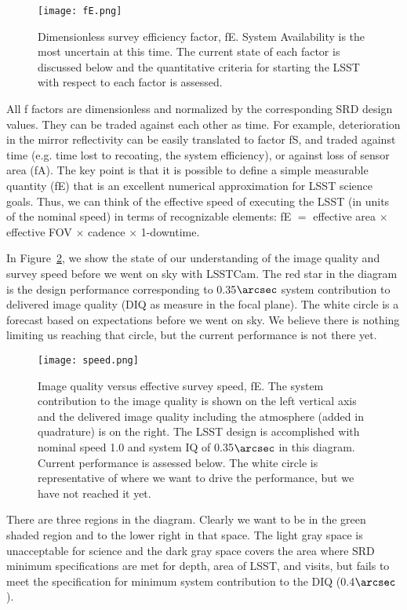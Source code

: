 \begin{figure}%
  \centering
\texttt{[image: fE.png]}
\caption{Dimensionless survey efficiency factor, fE. System Availability is the most uncertain at this time. The current state of each factor is discussed below and the quantitative criteria for starting the LSST with respect to each factor is assessed.}
\label{fE}
\end{figure}

All f factors are dimensionless and normalized by the corresponding SRD design values. They can be traded against each other as time.
For example, deterioration in the mirror reflectivity can be easily translated to factor fS, and traded against time (e.g. time lost to recoating, the system efficiency), or against loss of sensor area (fA).
The key point is that it is possible to define a simple measurable quantity (fE) that is an excellent numerical approximation for LSST science goals. Thus, we can think of the effective speed of executing the LSST (in units of the nominal speed) in terms of recognizable elements:  fE $=$ effective area $\times$ effective FOV $\times$ cadence $\times$ 1-downtime.

In Figure~\ref{speed}, we show the state of our understanding of the image quality and survey speed before we went on sky with LSSTCam. The red star in the diagram is the design performance corresponding to 0.35$\arcsec$ system contribution to delivered image quality (DIQ as measure in the focal plane). The white circle is a forecast based on expectations before we went on sky. We believe there is nothing limiting us reaching that circle, but the current performance is not there yet. 

\begin{figure}[t]
  \centering
\texttt{[image: speed.png]}
\caption{Image quality versus effective survey speed, fE. The system contribution to the image quality is shown on the left vertical axis and the delivered image quality including the atmosphere (added in quadrature) is on the right. The LSST design is accomplished with nominal speed 1.0 and system IQ of 0.35$\arcsec$ in this diagram. Current performance is assessed below. The white circle is representative of where we want to drive the performance, but we have not reached it yet.}
\label{speed}
\end{figure}

There are three regions in the diagram. Clearly we want to be in the green shaded region and to the lower right in that space. The light gray space is unacceptable for science and the dark gray space covers the area where SRD minimum specifications are met for depth, area of LSST, and visits, but fails to meet the specification for minimum system contribution to the DIQ (0.4$\arcsec$). 

